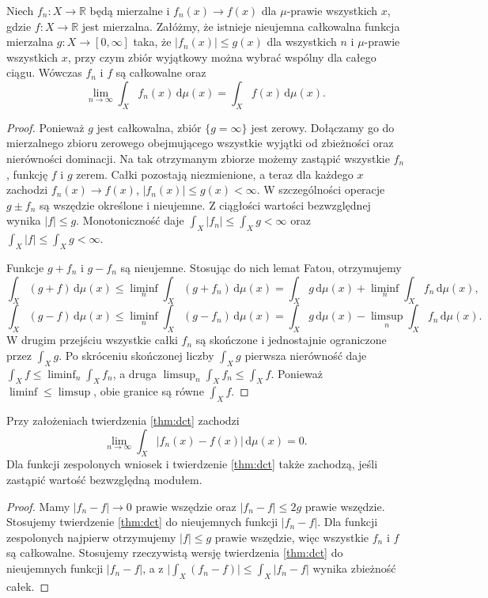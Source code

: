 \begin{twierdzenie}
\label{thm:dct}
Niech $f_n:X\to\mathbb R$ będą mierzalne i
$f_n(x)\to f(x)$ dla $\mu$-prawie wszystkich $x$, gdzie
$f:X\to\mathbb R$ jest mierzalna. Załóżmy, że
istnieje nieujemna całkowalna funkcja mierzalna
$g:X\to[0,\infty]$ taka, że
$|f_n(x)|\le g(x)$ dla wszystkich $n$ i
$\mu$-prawie wszystkich $x$, przy czym zbiór
wyjątkowy można wybrać wspólny dla całego ciągu.
Wówczas $f_n$ i $f$ są całkowalne oraz
\begin{equation}\label{eq:dct}
\lim_{n\to\infty}\int_Xf_n(x)\,\mathrm d\mu(x)
=\int_Xf(x)\,\mathrm d\mu(x).
\end{equation}
\end{twierdzenie}
\begin{proof}
Ponieważ $g$ jest całkowalna, zbiór $\{g=\infty\}$
jest zerowy. Dołączamy go do mierzalnego zbioru zerowego obejmującego
wszystkie wyjątki od zbieżności oraz nierówności dominacji.
Na tak otrzymanym zbiorze możemy zastąpić wszystkie
$f_n$, funkcję $f$ i $g$ zerem. Całki pozostają
niezmienione, a teraz dla każdego $x$ zachodzi
$f_n(x)\to f(x)$, $|f_n(x)|\le g(x)<\infty$.
W szczególności operacje $g\pm f_n$ są wszędzie
określone i nieujemne.
Z ciągłości wartości bezwzględnej wynika $|f|\le g$.
Monotoniczność daje
$\int_X|f_n|\le\int_X g<\infty$ oraz
$\int_X|f|\le\int_X g<\infty$.

Funkcje $g+f_n$ i $g-f_n$ są nieujemne.
Stosując do nich lemat Fatou, otrzymujemy
\[
\int_X(g+f)\,\mathrm d\mu(x)
\le\liminf_n\int_X(g+f_n)\,\mathrm d\mu(x)
=\int_Xg\,\mathrm d\mu(x)+
\liminf_n\int_Xf_n\,\mathrm d\mu(x),
\]
\[
\int_X(g-f)\,\mathrm d\mu(x)
\le\liminf_n\int_X(g-f_n)\,\mathrm d\mu(x)
=\int_Xg\,\mathrm d\mu(x)-
\limsup_n\int_Xf_n\,\mathrm d\mu(x).
\]
W drugim przejściu wszystkie całki $f_n$ są
skończone i jednostajnie ograniczone przez $\int_X g$.
Po skróceniu skończonej liczby $\int_X g$ pierwsza
nierówność daje
$\int_X f\le\liminf_n\int_X f_n$, a druga
$\limsup_n\int_X f_n\le\int_X f$.
Ponieważ $\liminf\le\limsup$, obie granice
są równe $\int_X f$.
\end{proof}

\begin{wniosek}
\label{cor:dct-l1}
Przy założeniach twierdzenia \ref{thm:dct} zachodzi
\[
\lim_{n\to\infty}\int_X|f_n(x)-f(x)|\,\mathrm d\mu(x)=0.
\]
Dla funkcji zespolonych wniosek i twierdzenie
\ref{thm:dct} także zachodzą, jeśli zastąpić
wartość bezwzględną modułem.
\end{wniosek}
\begin{proof}
Mamy $|f_n-f|\to0$ prawie wszędzie oraz
$|f_n-f|\le2g$ prawie wszędzie.
Stosujemy twierdzenie \ref{thm:dct} do nieujemnych
funkcji $|f_n-f|$. Dla funkcji zespolonych najpierw otrzymujemy $|f|\le g$
prawie wszędzie, więc wszystkie $f_n$ i $f$ są całkowalne.
Stosujemy rzeczywistą wersję twierdzenia \ref{thm:dct}
do nieujemnych funkcji $|f_n-f|$, a z
$\bigl|\int_X(f_n-f)\bigr|\le\int_X|f_n-f|$
wynika zbieżność całek.
\end{proof}

